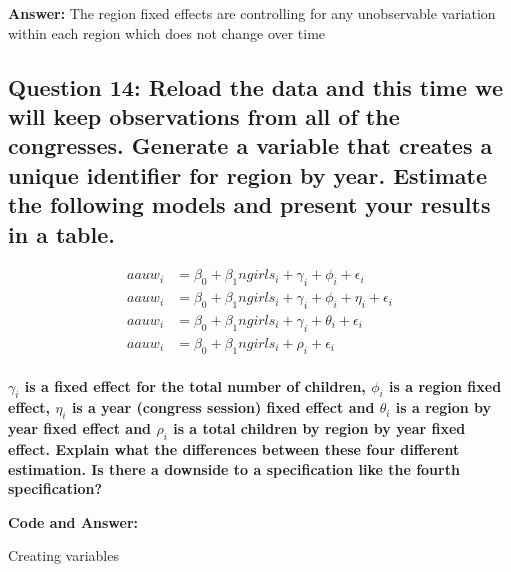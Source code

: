 \documentclass[
]{article}
\newenvironment{Shaded}{\begin{snugshade}}{\end{snugshade}}
\newcommand{\CommentTok}[1]{\textcolor[rgb]{0.56,0.35,0.01}{\textit{#1}}}
\newcommand{\FunctionTok}[1]{\textcolor[rgb]{0.00,0.00,0.00}{#1}}
\newcommand{\NormalTok}[1]{#1}
\newcommand{\SpecialCharTok}[1]{\textcolor[rgb]{0.00,0.00,0.00}{#1}}
\begin{document}
\textbf{Answer:} The region fixed effects are controlling for any
unobservable variation within each region which does not change over
time

\hypertarget{question-14-reload-the-data-and-this-time-we-will-keep-observations-from-all-of-the-congresses.-generate-a-variable-that-creates-a-unique-identifier-for-region-by-year.-estimate-the-following-models-and-present-your-results-in-a-table.}{%
\subsection{Question 14: Reload the data and this time we will keep
observations from all of the congresses. Generate a variable that
creates a unique identifier for region by year. Estimate the following
models and present your results in a
table.}\label{question-14-reload-the-data-and-this-time-we-will-keep-observations-from-all-of-the-congresses.-generate-a-variable-that-creates-a-unique-identifier-for-region-by-year.-estimate-the-following-models-and-present-your-results-in-a-table.}}

\[
\begin{aligned}
    aauw_i&=\beta_0+\beta_1ngirls_i+\gamma_i+\phi_i+\epsilon_i\\
    aauw_i&=\beta_0+\beta_1ngirls_i+\gamma_i+\phi_i+\eta_i+\epsilon_i\\
    aauw_i&=\beta_0+\beta_1ngirls_i+\gamma_i+\theta_i+\epsilon_i\\
    aauw_i&=\beta_0+\beta_1ngirls_i+\rho_i+\epsilon_i\\
\end{aligned}
\]

\textbf{\(\gamma_i\) is a fixed effect for the total number of children,
\(\phi_i\) is a region fixed effect, \(\eta_i\) is a year (congress
session) fixed effect and \(\theta_i\) is a region by year fixed effect
and \(\rho_i\) is a total children by region by year fixed effect.
Explain what the differences between these four different estimation. Is
there a downside to a specification like the fourth specification? }

\textbf{Code and Answer:}

Creating variables

\begin{Shaded}
\end{Shaded}
\end{document}
